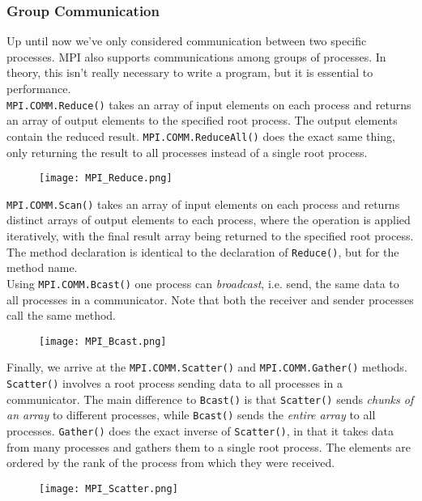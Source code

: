 \documentclass[main]{subfiles}
\begin{document}
\subsubsection{Group Communication}
Up until now we've only considered communication between two specific processes. MPI also supports communications among groups of processes. In theory, this isn't really necessary to write a program, but it is essential to performance.\\[3mm]
\texttt{MPI.COMM.Reduce()} takes an array of input elements on each process and returns an array of output elements to the specified root process. The output elements contain the reduced result. \texttt{MPI.COMM.ReduceAll()} does the exact same thing, only returning the result to all processes instead of a single root process.\\[3mm]
\begin{figure}[H]
    \centering
    \texttt{[image: MPI\_Reduce.png]}
\end{figure}
\texttt{MPI.COMM.Scan()} takes an array of input elements on each process and returns distinct arrays of output elements to each process, where the operation is applied iteratively, with the final result array being returned to the specified root process. The method declaration is identical to the declaration of \texttt{Reduce()}, but for the method name.\\[3mm]
Using \texttt{MPI.COMM.Bcast()} one process can \textit{broadcast}, i.e. send, the same data to all processes in a communicator. Note that both the receiver and sender processes call the same method.
\begin{figure}[H]
    \centering
    \texttt{[image: MPI\_Bcast.png]}
\end{figure}
Finally, we arrive at the \texttt{MPI.COMM.Scatter()} and \texttt{MPI.COMM.Gather()} methods. \texttt{Scatter()} involves a root process sending data to all processes in a communicator. The main difference to \texttt{Bcast()} is that \texttt{Scatter()} sends \textit{chunks of an array} to different processes, while \texttt{Bcast()} sends the \textit{entire array} to all processes. \texttt{Gather()} does the exact inverse of \texttt{Scatter()}, in that it takes data from many processes and gathers them to a single root process. The elements are ordered by the rank of the process from which they were received.
\begin{figure}[H]
    \centering
    \texttt{[image: MPI\_Scatter.png]}
\end{figure}
\end{document}
